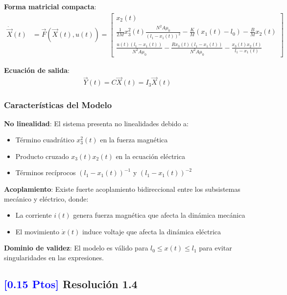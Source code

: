 \documentclass[
  11pt,
  letterpaper,
   addpoints,
   answers
  ]{exam}
\begin{document}
\begin{solution}
\textbf{Forma matricial compacta}:
\begin{align}
\dot{\vec{X}}(t) &= \vec{F}(\vec{X}(t), u(t)) = \begin{bmatrix}
x_2(t) \\[4pt]
\displaystyle \frac{1}{2M} x_3^2(t) \frac{N^2 A \mu_0}{(l_1 - x_1(t))^2} - \frac{K}{M}(x_1(t) - l_0) - \frac{B}{M} x_2(t) \\[8pt]
\displaystyle \frac{u(t)(l_1 - x_1(t))}{N^2 A \mu_0} - \frac{R x_3(t)(l_1 - x_1(t))}{N^2 A \mu_0} - \frac{x_3(t) x_2(t)}{l_1 - x_1(t)}
\end{bmatrix}
\end{align}

\textbf{Ecuación de salida}:
\begin{align}
\vec{Y}(t) = C \vec{X}(t) = I_3 \vec{X}(t)
\end{align}

\subsubsection*{Características del Modelo}

\textbf{No linealidad}: El sistema presenta no linealidades debido a:
\begin{itemize}
    \item Término cuadrático $x_3^2(t)$ en la fuerza magnética
    \item Producto cruzado $x_3(t) x_2(t)$ en la ecuación eléctrica
    \item Términos recíprocos $(l_1 - x_1(t))^{-1}$ y $(l_1 - x_1(t))^{-2}$
\end{itemize}

\textbf{Acoplamiento}: Existe fuerte acoplamiento bidireccional entre los subsistemas mecánico y eléctrico, donde:
\begin{itemize}
    \item La corriente $i(t)$ genera fuerza magnética que afecta la dinámica mecánica
    \item El movimiento $\dot{x}(t)$ induce voltaje que afecta la dinámica eléctrica
\end{itemize}

\textbf{Dominio de validez}: El modelo es válido para $l_0 \leq x(t) \leq l_1$ para evitar singularidades en las expresiones.
\subsection*{\textcolor{blue}{[0.15 Ptos]} Resolución 1.4}


\end{solution}
\end{document}
